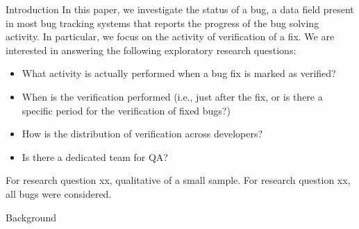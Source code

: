 \begin{section}{Introduction}
In this paper, we investigate the status of a bug, a data field present in most bug tracking systems that reports the progress of the bug solving activity. In particular, we focus on the activity of verification of a fix. We are interested in answering the following exploratory research questions:

\begin{itemize}
	\item What activity is actually performed when a bug fix is marked as verified?
	\item When is the verification performed (i.e., just after the fix, or is there a specific period for the verification of fixed bugs?)
	\item How is the distribution of verification across developers?
	\item Is there a dedicated team for QA?
\end{itemize}

For research question xx, qualitative of a small sample. 
For research question xx, all bugs were considered.

\end{section}

\begin{section}{Background}
\end{section}


